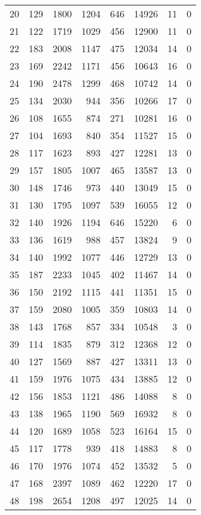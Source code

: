 \documentclass[letterpaper]{article}
\begin{document}
\begin{Schunk}
\begin{longtable}{rrrrrrrr}
  20 & 129 & 1800 & 1204 & 646 & 14926 & 11 & 0 \\ 
  21 & 122 & 1719 & 1029 & 456 & 12900 & 11 & 0 \\ 
  22 & 183 & 2008 & 1147 & 475 & 12034 & 14 & 0 \\ 
  23 & 169 & 2242 & 1171 & 456 & 10643 & 16 & 0 \\ 
  24 & 190 & 2478 & 1299 & 468 & 10742 & 14 & 0 \\ 
  25 & 134 & 2030 & 944 & 356 & 10266 & 17 & 0 \\ 
  26 & 108 & 1655 & 874 & 271 & 10281 & 16 & 0 \\ 
  27 & 104 & 1693 & 840 & 354 & 11527 & 15 & 0 \\ 
  28 & 117 & 1623 & 893 & 427 & 12281 & 13 & 0 \\ 
  29 & 157 & 1805 & 1007 & 465 & 13587 & 13 & 0 \\ 
  30 & 148 & 1746 & 973 & 440 & 13049 & 15 & 0 \\ 
  31 & 130 & 1795 & 1097 & 539 & 16055 & 12 & 0 \\ 
  32 & 140 & 1926 & 1194 & 646 & 15220 & 6 & 0 \\ 
  33 & 136 & 1619 & 988 & 457 & 13824 & 9 & 0 \\ 
  34 & 140 & 1992 & 1077 & 446 & 12729 & 13 & 0 \\ 
  35 & 187 & 2233 & 1045 & 402 & 11467 & 14 & 0 \\ 
  36 & 150 & 2192 & 1115 & 441 & 11351 & 15 & 0 \\ 
  37 & 159 & 2080 & 1005 & 359 & 10803 & 14 & 0 \\ 
  38 & 143 & 1768 & 857 & 334 & 10548 & 3 & 0 \\ 
  39 & 114 & 1835 & 879 & 312 & 12368 & 12 & 0 \\ 
  40 & 127 & 1569 & 887 & 427 & 13311 & 13 & 0 \\ 
  41 & 159 & 1976 & 1075 & 434 & 13885 & 12 & 0 \\ 
  42 & 156 & 1853 & 1121 & 486 & 14088 & 8 & 0 \\ 
  43 & 138 & 1965 & 1190 & 569 & 16932 & 8 & 0 \\ 
  44 & 120 & 1689 & 1058 & 523 & 16164 & 15 & 0 \\ 
  45 & 117 & 1778 & 939 & 418 & 14883 & 8 & 0 \\ 
  46 & 170 & 1976 & 1074 & 452 & 13532 & 5 & 0 \\ 
  47 & 168 & 2397 & 1089 & 462 & 12220 & 17 & 0 \\ 
  48 & 198 & 2654 & 1208 & 497 & 12025 & 14 & 0 \\ 

\end{longtable}
\end{Schunk}
\end{document}
